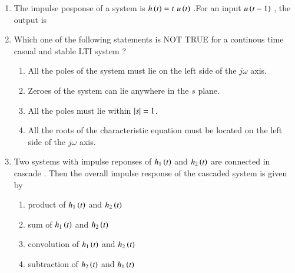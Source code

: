\documentclass[journal]{IEEEtran}
\begin{document}
\begin{enumerate}
\begin{figure}[!ht]
{}
\label{fig:my_label}
\end{figure}
\begin{enumerate}
\end{enumerate}
\item The impulse pesponse of a system is $h\left(t\right)=t \, \, u\left(t\right)$ .For an input $u\left(t-1\right)$ , the output is 
\begin{enumerate}
\end{enumerate}
\item Which one of the following statements is NOT TRUE for a continous time casual and stable LTI system ? 
\begin{enumerate}
\item All the poles of the system must lie on the left side of the $j\omega$ axis.
\item  Zeroes of the system can lie anywhere in the $s$ plane.
\item All the poles must lie within $\left\vert s\right\vert=1$.
\item All the roots of the characteristic equation must be located on the left side of the $j\omega$ axis.
\end{enumerate}
\item Two systems with impulse reponses of $h_1\left(t\right)$ and $h_2\left(t\right)$ are connected in cascade . Then the overall impulse response of the cascaded system is given by
\begin{enumerate}
\item product of $h_1\left(t\right)$ and $h_2\left(t\right)$  
\item sum of $h_1\left(t\right)$ and $h_2\left(t\right)$
\item convolution of $h_1\left(t\right)$ and $h_2\left(t\right)$ 
\item subtraction of $h_2\left(t\right)$ and $h_1\left(t\right)$ 

\end{enumerate}
\end{enumerate}
\end{document}
